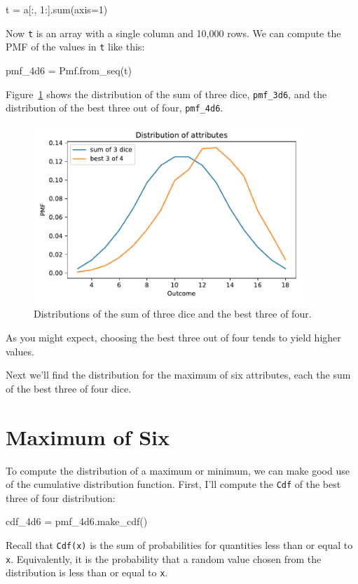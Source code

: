 \documentclass[12pt]{book}
\theoremstyle{exercise}
\newcommand{\py}[1]{{\tt #1}}%
\begin{document}
\begin{code}
t = a[:, 1:].sum(axis=1)
\end{code}

Now \py{t} is an array with a single column and 10,000 rows.
We can compute the PMF of the values in \py{t} like this:

\begin{code}
pmf_4d6 = Pmf.from_seq(t)
\end{code}

Figure~\ref{fig06-02} shows the distribution of the sum of three dice, \py{pmf_3d6}, and the distribution of the best three out of four, \py{pmf_4d6}.

\begin{figure}
\centerline{\includegraphics[width=4in]{figs/fig06-02.pdf}}
\caption{Distributions of the sum of three dice and the best three of four.}
\label{fig06-02}
\end{figure}

As you might expect, choosing the best three out of four tends to yield higher values.

Next we'll find the distribution for the maximum of six attributes, each the sum of the best three of four dice.


\section{Maximum of Six}

To compute the distribution of a maximum or minimum, we can make good use of the cumulative distribution function.
First, I'll compute the \py{Cdf} of the best three of four distribution:

\begin{code}
cdf_4d6 = pmf_4d6.make_cdf()
\end{code}

Recall that \py{Cdf(x)} is the sum of probabilities for quantities less than or equal to \py{x}.
Equivalently, it is the probability that a random value chosen from the distribution is less than or equal to \py{x}.
\end{document}

